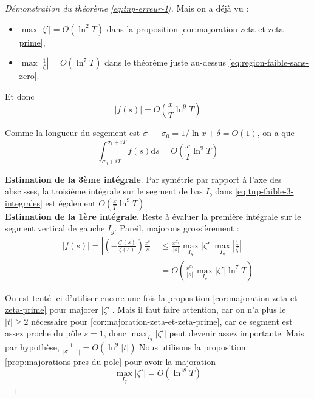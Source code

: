 \documentclass[french]{report}
\begin{document}
\begin{proof}[Démonstration du théorème \ref{eq:tnp-erreur-1}]
  Mais on a déjà vu :
  \begin{itemize}
    \item $\max|\zeta'| = O(\ln^2 T)$ dans la proposition \ref{cor:majoration-zeta-et-zeta-prime},
    \item $\max|\frac{1}{\zeta}| = O(\ln^7 T)$ dans le théorème juste au-dessus \ref{eq:region-faible-sans-zero}.
  \end{itemize}

  Et donc
  \[ |f(s)| = O\left(\frac{x}{T}\ln^9T\right) \]

  Comme la longueur du segement est $\sigma_1-\sigma_0=1/\ln x+\delta=O(1)$, on a que
  \begin{equation}\label{eq:tnp-faible-3-integrales-part1}
    \int_{\sigma_0+iT}^{\sigma_1+iT}f(s)\mathrm{d}s = O\left(\frac{x}{T}\ln^9T\right)
  \end{equation}

  \textbf{Estimation de la 3ème intégrale}. Par symétrie par rapport à l'axe des abscisses, la troisième intégrale sur le segment de bas $I_b$ dans \ref{eq:tnp-faible-3-integrales} est également $O\left(\frac{x}{T}\ln^9T\right)$.
  \\

  \textbf{Estimation de la 1ère intégrale}. Reste à évaluer la première intégrale sur le segment vertical de gauche $I_g$. Pareil, majorons grossièrement :
  \begin{align*}
    |f(s)| = \left|\left(-\frac{\zeta'(s)}{\zeta(s)}\right)\frac{x^s}{s}\right| & \leq\frac{x^{\sigma_0}}{|s|}\max_{I_g}|\zeta'|\max_{I_g}\left|\frac{1}{\zeta}\right| \\
    & = O\left(\frac{x^{\sigma_0}}{|s|}\max_{I_g}|\zeta'|\ln^7 T\right)
  \end{align*}

  On est tenté ici d'utiliser encore une fois la proposition \ref{cor:majoration-zeta-et-zeta-prime} pour majorer $|\zeta'|$. Mais il faut faire attention, car on n'a plus le $|t|\geq2$ nécessaire pour \ref{cor:majoration-zeta-et-zeta-prime}, car ce segment est assez proche du pôle $s=1$, donc $\max_{I_g}|\zeta'|$ peut devenir assez importante. Mais par hypothèse, $\frac{1}{|\sigma-1|}=O(\ln^9|t|)$ Nous utilisons la proposition \ref{prop:majorations-pres-du-pole} pour avoir la majoration
  \begin{equation}\label{eq:tnp-faible-3-integrales-part2}
    \max_{I_g}|\zeta'|=O(\ln^{18}T)
  \end{equation}



\end{proof}
\end{document}
